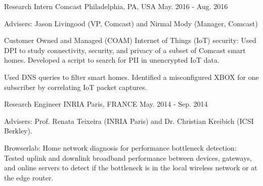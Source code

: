 
\begin{cventries}

  \cventry
    {Research Intern} %
    {Comcast} %
    {Philadelphia, PA, USA} %
    {May. 2016 - Aug. 2016} %
    {
      \begin{cvitems} %
      \item {Advisers: Jason Livingood (VP, Comcast) and Nirmal Mody (Manager, Comcast)}
%      
      \item {Customer Owned and Managed (COAM) Internet of Things (IoT) security: Used DPI to study connectivity, security, and privacy of a subset of Comcast smart homes. Developed a script to search for PII in unencrypted IoT data.}
      \item {Used DNS queries to filter smart homes. Identified a misconfigured XBOX for one subscriber by correlating IoT packet captures.}
%      
      \end{cvitems}
    }

  \cventry
    {Research Engineer} %
    {INRIA} %
    {Paris, FRANCE} %
    {May. 2014 - Sep. 2014} %
    {
      \begin{cvitems} %
      \item {Advisers: Prof. Renata Teixeira (INRIA Paris) and Dr. Christian Kreibich (ICSI Berkley).}
%      
      \item {Browserlab: Home network diagnosis for performance bottleneck detection: Tested uplink and downlink broadband performance between devices, gateways, and online servers to detect if the bottleneck is in the local wireless network or at the edge router.}
%      
      \end{cvitems}
    }
    

\end{cventries}
